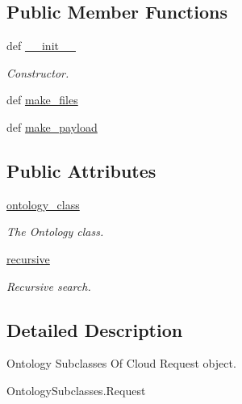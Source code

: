 \subsection*{Public Member Functions}
\begin{DoxyCompactItemize}
\item 
def \hyperlink{classRappCloud_1_1CloudMsgs_1_1OntologySubclasses_1_1OntologySubclasses_1_1Request_a19a2143c587e80965681b4b87992519d}{\-\_\-\-\_\-init\-\_\-\-\_\-}
\begin{DoxyCompactList}\small\item\em Constructor. \end{DoxyCompactList}\item 
def \hyperlink{classRappCloud_1_1CloudMsgs_1_1OntologySubclasses_1_1OntologySubclasses_1_1Request_a0aaaecf39e20244722462b6fcdb2c145}{make\-\_\-files}
\item 
def \hyperlink{classRappCloud_1_1CloudMsgs_1_1OntologySubclasses_1_1OntologySubclasses_1_1Request_a80de23dc4a18ebf5831bd9b68a9b9e5c}{make\-\_\-payload}
\end{DoxyCompactItemize}
\subsection*{Public Attributes}
\begin{DoxyCompactItemize}
\item 
\hyperlink{classRappCloud_1_1CloudMsgs_1_1OntologySubclasses_1_1OntologySubclasses_1_1Request_a553f7be7723024bd5fdfaa89f2eb5e3d}{ontology\-\_\-class}
\begin{DoxyCompactList}\small\item\em The Ontology class. \end{DoxyCompactList}\item 
\hyperlink{classRappCloud_1_1CloudMsgs_1_1OntologySubclasses_1_1OntologySubclasses_1_1Request_aee51b66447b03981a8f7fa8895bd8791}{recursive}
\begin{DoxyCompactList}\small\item\em Recursive search. \end{DoxyCompactList}\end{DoxyCompactItemize}


\subsection{Detailed Description}
\begin{DoxyVerb}Ontology Subclasses Of Cloud Request object.

OntologySubclasses.Request
\end{DoxyVerb}
 

